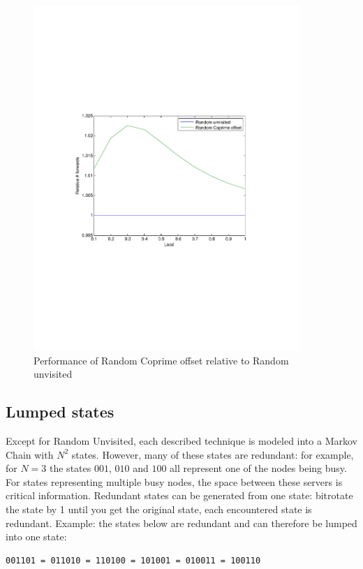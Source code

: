 \documentclass[10pt,a4paper]{article}
\begin{document}
\begin{figure}[h!tb]
\centering
\includegraphics[clip=true, trim=9em 24em 9em 24em, width=0.9\textwidth]{resources/plotrandunvisitedrandprime.pdf}
\caption{Performance of Random Coprime offset relative to Random unvisited}
\label{figrurcpo}
\end{figure}

\subsection{Lumped states}
\label{lump}

Except for Random Unvisited, each described technique is modeled into a Markov Chain with $N^2$ states. However, many of these states are redundant: for example, for $N=3$ the states $001$, $010$ and $100$ all represent one of the nodes being busy. For states representing multiple busy nodes, the space between these servers is critical information. Redundant states can be generated from one state: bitrotate the state by 1 until you get the original state, each encountered state is redundant.
Example: the states below are redundant and can therefore be lumped into one state:
\begin{verbatim}
001101 = 011010 = 110100 = 101001 = 010011 = 100110
\end{verbatim}
\end{document}
